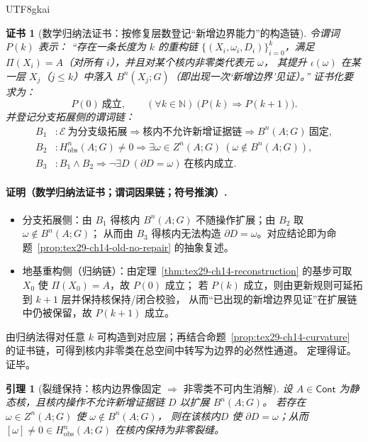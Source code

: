 \documentclass[12pt]{article}
\newtheorem{lemma}{引理}[section]
\newtheorem{Certificate}{证书}[section]
\newcommand{\NN}{\mathbb{N}}
\newcommand{\KouJing}{\texorpdfstring{表述约定}{表述约定}}
\begin{document}
\begin{CJK*}{UTF8}{gkai}
\begin{Certificate}[数学归纳法证书：按修复层数登记“新增边界能力”的构造链]
\label{cert:tex29-ch15-branch-vs-foundation}
令谓词 $P(k)$ 表示：
“存在一条长度为 $k$ 的重构链 $\{(X_i,\omega_i,D_i)\}_{i=0}^{k}$，满足 $\Pi(X_i)=A$（对所有 $i$），并且对某个核内非零类代表元 $\omega$，
其提升 $\iota(\omega)$ 在某一层 $X_j$（$j\le k$）中落入 $B^n(X_j;G)$（即出现一次‘新增边界’见证）。”
证书化要求为：
\[
  P(0)\ \text{成立},\qquad (\forall k\in\NN)\ \bigl(P(k)\Rightarrow P(k+1)\bigr).
\]
并登记分支拓展侧的谓词链：
\[
\begin{aligned}
  B_1 &: \mathcal{E}\ \text{为分支级拓展}\Rightarrow \text{核内不允许新增证据链}\Rightarrow B^n(A;G)\ \text{固定},\\
  B_2 &: H^n_{\mathrm{obs}}(A;G)\neq 0\Rightarrow \exists \omega\in Z^n(A;G)\ (\omega\notin B^n(A;G)),\\
  B_3 &: B_1\wedge B_2\Rightarrow \neg\exists D\ (\partial D=\omega)\ \text{在核内成立}.
\end{aligned}
\]
\end{Certificate}

\paragraph{证明（数学归纳法证书；谓词因果链；符号推演）.}
\begin{itemize}
  \item 分支拓展侧：由 $B_1$ 得核内 $B^n(A;G)$ 不随操作扩展；由 $B_2$ 取 $\omega\notin B^n(A;G)$；
  从而由 $B_3$ 得核内无法构造 $\partial D=\omega$。对应结论即为命题~\ref{prop:tex29-ch14-old-no-repair} 的抽象复述。
  \item 地基重构侧（归纳链）：由定理~\ref{thm:tex29-ch14-reconstruction} 的基步可取 $X_0$ 使 $\Pi(X_0)=A$，故 $P(0)$ 成立；
  若 $P(k)$ 成立，则由更新规则可延拓到 $k+1$ 层并保持核保持/闭合校验，
  从而“已出现的新增边界见证”在扩展链中仍被保留，故 $P(k+1)$ 成立。
\end{itemize}
由归纳法得对任意 $k$ 可构造到对应层；再结合命题~\ref{prop:tex29-ch14-curvature} 的证书链，可得到核内非零类在总空间中转写为边界的必然性通道。
定理得证。证毕。

\begin{lemma}[裂缝保持：核内边界像固定 $\Rightarrow$ 非零类不可内生消解]
\label{lem:tex29-ch15-crack-persist}
设 $A\in\mathsf{Cont}$ 为静态核，且核内操作不允许新增证据链 $D$ 以扩展 $B^n(A;G)$。
若存在 $\omega\in Z^n(A;G)$ 使 $\omega\notin B^n(A;G)$，
则在该核内 $D$ 使 $\partial D=\omega$；从而 $[\omega]\neq 0\in H^n_{\mathrm{obs}}(A;G)$ 在核内保持为非零裂缝。
\end{lemma}


\end{CJK*}
\end{document}

